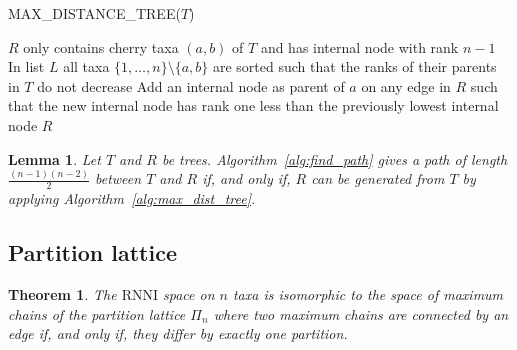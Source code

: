 \documentclass{amsart}
\newcommand{\rnni}{\mathrm{RNNI}}
\newtheorem{theorem}[definition]{Theorem}
\newtheorem{lemma}[definition]{Lemma}
\begin{document}
\begin{algorithm}[H]
\caption{MAX\_DISTANCE\_TREE($T$)}
\label{alg:max_dist_tree}
\begin{algorithmic}[1]
	\STATE $R$ only contains cherry taxa $(a,b)$ of $T$ and has internal node with rank $n-1$
    \STATE In list $L$ all taxa $\{1,\ldots,n\}\setminus\{a,b\}$ are sorted such that the ranks of their parents in $T$ do not decrease
		\STATE Add an internal node as parent of $a$ on any edge in $R$ such that the new internal node has rank one less than the previously lowest internal node
	\ENDFOR
	\RETURN $R$
\end{algorithmic}
\end{algorithm}

\begin{lemma}
    Let $T$ and $R$ be trees.
    Algorithm~\ref{alg:find_path} gives a path of length $\frac{(n-1)(n-2)}{2}$ between $T$ and $R$ if, and only if, $R$ can be generated from $T$ by applying Algorithm~\ref{alg:max_dist_tree}.
\end{lemma}



\subsection{Partition lattice}


\begin{theorem}
	The $\rnni$ space on $n$ taxa is isomorphic to the space of maximum chains of the partition lattice $\Pi_n$ where two maximum chains are connected by an edge if, and only if, they differ by exactly one partition.
\end{theorem}


\printbibliography
\end{document}
